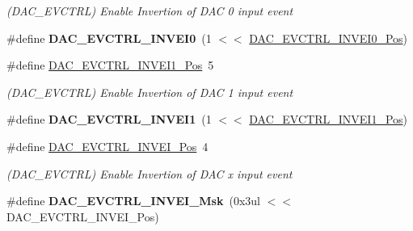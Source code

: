 \begin{DoxyCompactItemize}
\begin{DoxyCompactList}\small\item\em (D\+A\+C\+\_\+\+E\+V\+C\+T\+R\+L) Enable Invertion of D\+A\+C 0 input event \end{DoxyCompactList}\item 
\hypertarget{group___s_a_m_l21___d_a_c_gab0b79a1e785242a77dbeb9d5ba7ca02b}{}\#define {\bfseries D\+A\+C\+\_\+\+E\+V\+C\+T\+R\+L\+\_\+\+I\+N\+V\+E\+I0}~(1 $<$$<$ \hyperlink{group___s_a_m_l21___d_a_c_gaedf1c4a8e40d019a88fe9e5dd7090e48}{D\+A\+C\+\_\+\+E\+V\+C\+T\+R\+L\+\_\+\+I\+N\+V\+E\+I0\+\_\+\+Pos})\label{group___s_a_m_l21___d_a_c_gab0b79a1e785242a77dbeb9d5ba7ca02b}

\item 
\hypertarget{group___s_a_m_l21___d_a_c_gae64023a88f14c6fab237d0d7f4ecb6de}{}\#define \hyperlink{group___s_a_m_l21___d_a_c_gae64023a88f14c6fab237d0d7f4ecb6de}{D\+A\+C\+\_\+\+E\+V\+C\+T\+R\+L\+\_\+\+I\+N\+V\+E\+I1\+\_\+\+Pos}~5\label{group___s_a_m_l21___d_a_c_gae64023a88f14c6fab237d0d7f4ecb6de}

\begin{DoxyCompactList}\small\item\em (D\+A\+C\+\_\+\+E\+V\+C\+T\+R\+L) Enable Invertion of D\+A\+C 1 input event \end{DoxyCompactList}\item 
\hypertarget{group___s_a_m_l21___d_a_c_gaf381bef6f9318f5414564170de647a1c}{}\#define {\bfseries D\+A\+C\+\_\+\+E\+V\+C\+T\+R\+L\+\_\+\+I\+N\+V\+E\+I1}~(1 $<$$<$ \hyperlink{group___s_a_m_l21___d_a_c_gae64023a88f14c6fab237d0d7f4ecb6de}{D\+A\+C\+\_\+\+E\+V\+C\+T\+R\+L\+\_\+\+I\+N\+V\+E\+I1\+\_\+\+Pos})\label{group___s_a_m_l21___d_a_c_gaf381bef6f9318f5414564170de647a1c}

\item 
\hypertarget{group___s_a_m_l21___d_a_c_gaefbcfa90869ef66266567b81682f3f0e}{}\#define \hyperlink{group___s_a_m_l21___d_a_c_gaefbcfa90869ef66266567b81682f3f0e}{D\+A\+C\+\_\+\+E\+V\+C\+T\+R\+L\+\_\+\+I\+N\+V\+E\+I\+\_\+\+Pos}~4\label{group___s_a_m_l21___d_a_c_gaefbcfa90869ef66266567b81682f3f0e}

\begin{DoxyCompactList}\small\item\em (D\+A\+C\+\_\+\+E\+V\+C\+T\+R\+L) Enable Invertion of D\+A\+C x input event \end{DoxyCompactList}\item 
\hypertarget{group___s_a_m_l21___d_a_c_gab11b98b9466b5bad084d7761f9bfbd0b}{}\#define {\bfseries D\+A\+C\+\_\+\+E\+V\+C\+T\+R\+L\+\_\+\+I\+N\+V\+E\+I\+\_\+\+Msk}~(0x3ul $<$$<$ D\+A\+C\+\_\+\+E\+V\+C\+T\+R\+L\+\_\+\+I\+N\+V\+E\+I\+\_\+\+Pos)\label{group___s_a_m_l21___d_a_c_gab11b98b9466b5bad084d7761f9bfbd0b}


\end{DoxyCompactItemize}
